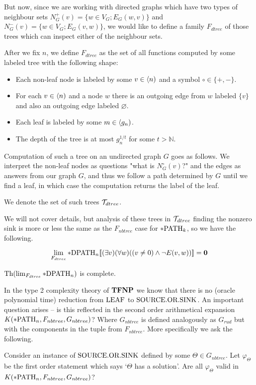 But now, since we are working with directed graphs which have two types of neighbour sets $N_G^+(v)=\{w\in V_G;E_G(w,v)\}$ and $N_G^-(v)=\{w\in V_G;E_G(v,w)\}$, we would like to define a family $F_{dtree}$ of those trees which can inspect either of the neighbour sets.

\begin{defi}
After we fix $n$, we define $F_{dtree}$ as the set of all functions computed by some labeled tree with the following shape:

\begin{itemize}
\item Each non-leaf node is labeled by some $v\in\langle n)$ and a symbol $\circ\in\{+,-\}$. 
\item For each $v \in \langle n)$ and a node $w$ there is an outgoing edge from $w$ labeled $\{v\}$ and also an outgoing edge labeled $\varnothing$.
\item Each leaf is labeled by some $m\in \langle g_n)$.
\item The depth of the tree is at most $g_n^{1/t}$ for some $t>\mathbb{N}$.
\end{itemize}

Computation of such a tree on an undirected graph $G$ goes as follows. We interpret the non-leaf nodes as questions "what is $N_G^\circ(v)$?" and the edges as answers from our graph $G$, and thus we follow a path determined by $G$ until we find a leaf, in which case the computation returns the label of the leaf.

We denote the set of such trees $\mathcal{T}_{dtree}$.
\end{defi}

We will not cover details, but analysis of these trees in $\mathcal{T}_{dtree}$ finding the nonzero sink is more or less the same as the $F_{nbtree}$ case for $*\text{PATH}_k$, so we have the following.

\begin{thrm}
\[\lim_{F_{dtree}}*\text{DPATH}_n[\![(\exists v)(\forall w)((v\not=0)\land \lnot E(v,w))]\!]=\textbf{0}\]
\end{thrm}

\begin{crll}\label{crllpDPATH}
$\text{Th}(\lim_{F_{dtree}}*\text{DPATH}_n)$ is complete.
\end{crll}

In the type 2 complexity theory of $\textbf{TFNP}$ we know that there is no (oracle polynomial time) reduction from $\text{LEAF}$ to $\text{SOURCE.OR.SINK}$. An important question arises -- is this reflected in the second order arithmetical expansion $K(*\text{PATH}_n,F_{nbtree},G_{nbtree})$? Where $G_{nbtree}$ is defined analogously as $G_{rud}$ but with the components in the tuple from $F_{nbtree}$. More specifically we ask the following.

\begin{ques}
Consider an instance of $\text{SOURCE.OR.SINK}$ defined by some $\Theta\in G_{nbtree}$. Let $\varphi_\Theta$ be the first order statement which says `$\Theta$ has a solution'. Are all $\varphi_\Theta$ valid in $K(*\text{PATH}_n,F_{nbtree},G_{nbtree})$?
\end{ques}
